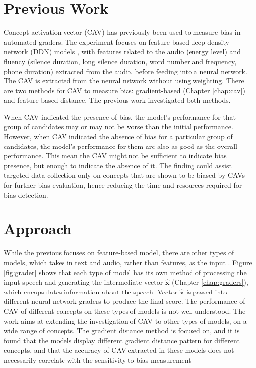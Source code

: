 \section{Previous Work}
Concept activation vector (CAV)  has previously been used to measure bias in automated graders. The experiment focuses on feature-based deep density network (DDN)  models \cite{feature_bias}, with features related to the audio (energy level) and fluency (silence duration, long silence duration, word number and frequency, phone duration) extracted from the audio, before feeding into a neural network. The CAV is extracted from the neural network without using weighting. There are two methods for CAV to measure bias: gradient-based (Chapter \ref{chap:cav}) and feature-based distance. The previous work investigated both methods.


When CAV indicated the presence of bias, the model's performance for that group of candidates may or may not be worse than the initial performance. However, when CAV indicated the absence of bias for a particular group of candidates, the model's performance for them are also as good as the overall performance. This mean the CAV might not be sufficient to indicate bias presence, but enough to indicate the absence of it. The finding could assist targeted data collection only on concepts that are shown to be biased by CAVs for further bias evaluation, hence reducing the time and resources required for bias detection.

\section{Approach}
While the previous focuses on feature-based model, there are other types of models, which takes in text and audio, rather than features, as the input \cite{graders}. Figure \ref{fig:grader} shows that each type of model has its own method of processing the input speech and generating the intermediate vector $\mathbf{\hat{x}}$ (Chapter \ref{chap:graders}), which encapsulates information about the speech. Vector $\mathbf{\hat{x}}$ is passed into different neural network graders to produce the final score. The performance of CAV of different concepts on these types of models is not well understood. The work aims at extending the investigation of CAV to other types of models, on a wide range of concepts. The gradient distance method is focused on, and it is found that the models display different gradient distance pattern for different concepts, and that the accuracy of CAV extracted in these models does not necessarily correlate with the sensitivity to bias measurement.

